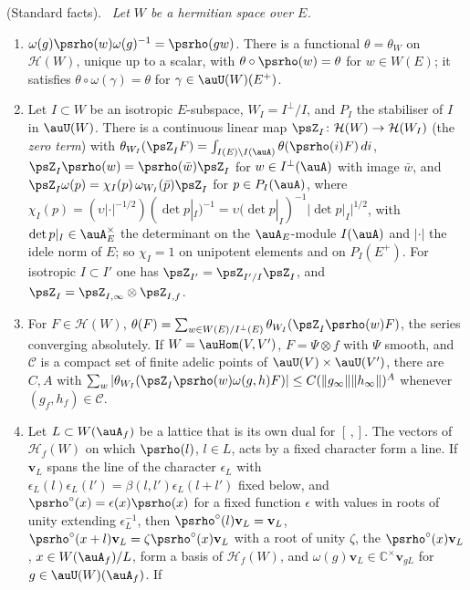 \documentclass[10pt]{amsart}
\theoremstyle{definition}
\theoremstyle{remark}
\newcommand{\C}{\mathbb C}
\providecommand{\psHS}{\mathcal H}
\providecommand{\psvac}{\mathbf v}
\newenvironment{quotedthm}[2]{\par\medskip\noindent\begingroup
  \textbf{#1}#2.\ \itshape\ignorespaces}{\endgroup\par\medskip}
\begin{document}
\begin{quotedthm}{\cite[Lemma~5.2]{P49}}{ (Standard facts)}
Let $W$ be a hermitian space over $E$.
\begin{enumerate}
\item[(W1)] $\omega(g)\psrho(w)\omega(g)^{-1}=\psrho(gw)$. There is a functional $\theta=\theta_W$
on $\psHS(W)$, unique up to a scalar, with $\theta\circ\psrho(w)=\theta$ for $w\in W(E)$; it
satisfies $\theta\circ\omega(\gamma)=\theta$ for $\gamma\in\auU(W)(E^+)$.
\item[(W2)] Let $I\subset W$ be an isotropic $E$-subspace, $W_I=I^\perp/I$, and $P_I$ the stabiliser
of $I$ in $\auU(W)$. There is a continuous linear map $\psZ_I\colon\psHS(W)\to\psHS(W_I)$ (the
\emph{zero term}) with $\theta_{W_I}(\psZ_IF)=\int_{I(E)\backslash I(\auA)}\theta(\psrho(i)F)\,di$,
$\psZ_I\psrho(w)=\psrho(\bar w)\psZ_I$ for $w\in I^\perp(\auA)$ with image $\bar w$, and
$\psZ_I\omega(p)=\chi_I(p)\,\omega_{W_I}(\bar p)\psZ_I$ for $p\in P_I(\auA)$, where $\chi_I(p)=
(\upsilon|\cdot|^{-1/2})(\det p|_I)^{-1}=\upsilon(\det p|_I)^{-1}|\det p|_I|^{1/2}$, with
$\det p|_I\in\auA_E^\times$ the determinant on the $\auA_E$-module $I(\auA)$ and $|\cdot|$ the
idele norm of $E$; so $\chi_I=1$ on unipotent elements and on $P_I(E^+)$.
For isotropic $I\subset I'$ one has $\psZ_{I'}=\psZ_{I'/I}\psZ_I$, and $\psZ_I=\psZ_{I,\infty}
\otimes\psZ_{I,f}$.
\item[(W3)] For $F\in\psHS(W)$, $\theta(F)=\sum_{w\in W(E)/I^\perp(E)}\theta_{W_I}(\psZ_I\psrho(w)F)$,
the series converging absolutely. If $W=\auHom(V,V')$, $F=\Psi\otimes f$ with $\Psi$ smooth, and
$\mathcal C$ is a compact set of finite adelic points of $\auU(V)\times\auU(V')$, there are $C,A$ with
$\sum_w|\theta_{W_I}(\psZ_I\psrho(w)\omega(g,h)F)|\le C(\|g_\infty\|\|h_\infty\|)^A$ whenever
$(g_f,h_f)\in\mathcal C$.
\item[(W4)] Let $L\subset W(\auA_f)$ be a lattice that is its own dual for $[\,,]$. The vectors of
$\psHS_f(W)$ on which $\psrho(l)$, $l\in L$, acts by a fixed character form a line. If $\psvac_L$
spans the line of the character $\epsilon_L$ with $\epsilon_L(l)\epsilon_L(l')=\beta(l,l')
\epsilon_L(l+l')$ fixed below, and $\psrho^\circ(x)=\epsilon(x)\psrho(x)$ for a fixed function
$\epsilon$ with values in roots of unity extending $\epsilon_L^{-1}$, then
$\psrho^\circ(l)\psvac_L=\psvac_L$, $\psrho^\circ(x+l)\psvac_L=\zeta\psrho^\circ(x)\psvac_L$ with a
root of unity $\zeta$, the $\psrho^\circ(x)\psvac_L$, $x\in W(\auA_f)/L$, form a basis of
$\psHS_f(W)$, and $\omega(g)\psvac_L\in\C^\times\psvac_{gL}$ for $g\in\auU(W)(\auA_f)$. If

\end{enumerate}
\end{quotedthm}
\end{document}
